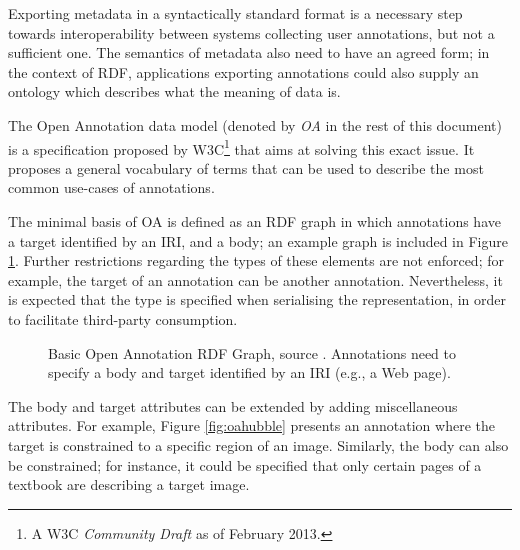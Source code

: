 
Exporting metadata in a syntactically standard format is a necessary step
towards interoperability between systems collecting user annotations, but not a
sufficient one. The semantics of metadata also need to have an agreed form;
in the context of RDF, applications exporting annotations could also supply an
ontology which describes what the meaning of data is.

The Open Annotation \cite{ref:oa} data model (denoted by \textit{OA} in the
rest of this document) is a specification proposed by W3C\footnote{A W3C
\textit{Community Draft} as of February 2013.} that aims at solving this
exact issue.  It proposes a general vocabulary of terms that can be used to
describe the most common use-cases of annotations.

The minimal basis of OA is defined as an RDF graph in which annotations have a
target identified by an IRI, and a body; an example graph is included in
Figure \ref{fig:oa}. Further restrictions regarding the types of these elements
are not enforced; for example, the target of an annotation can be another
annotation. Nevertheless, it is expected that the type is specified when
serialising the representation, in order to facilitate third-party consumption.

\begin{figure}[!ht]
  \centering
  \caption[Basic Open Annotation RDF Graph]
          {Basic Open Annotation RDF Graph, source \cite{ref:oa}. Annotations
           need to specify a body and target identified by an IRI (e.g., a
           Web page).}
  \label{fig:oa}
\end{figure}

The body and target attributes can be extended by adding miscellaneous attributes.
For example, Figure \ref{fig:oahubble} presents an annotation where the target
is constrained to a specific region of an image. Similarly, the body can also
be constrained; for instance, it could be specified that only certain pages of
a textbook are describing a target image.

